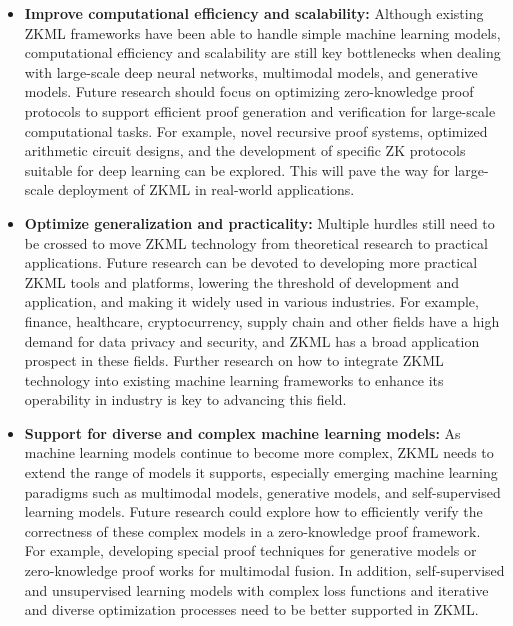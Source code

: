 \documentclass[journal]{IEEEtran}
\begin{document}
\begin{itemize}
    \item \textbf{Improve computational efficiency and scalability:} Although existing ZKML frameworks have been able to handle simple machine learning models, computational efficiency and scalability are still key bottlenecks when dealing with large-scale deep neural networks, multimodal models, and generative models. Future research should focus on optimizing zero-knowledge proof protocols to support efficient proof generation and verification for large-scale computational tasks. For example, novel recursive proof systems, optimized arithmetic circuit designs, and the development of specific ZK protocols suitable for deep learning can be explored. This will pave the way for large-scale deployment of ZKML in real-world applications.
    
    \item \textbf{Optimize generalization and practicality:} Multiple hurdles still need to be crossed to move ZKML technology from theoretical research to practical applications. Future research can be devoted to developing more practical ZKML tools and platforms, lowering the threshold of development and application, and making it widely used in various industries. For example, finance, healthcare, cryptocurrency, supply chain and other fields have a high demand for data privacy and security, and ZKML has a broad application prospect in these fields. Further research on how to integrate ZKML technology into existing machine learning frameworks to enhance its operability in industry is key to advancing this field.
    
    \item \textbf{Support for diverse and complex machine learning models:} As machine learning models continue to become more complex, ZKML needs to extend the range of models it supports, especially emerging machine learning paradigms such as multimodal models, generative models, and self-supervised learning models. Future research could explore how to efficiently verify the correctness of these complex models in a zero-knowledge proof framework. For example, developing special proof techniques for generative models or zero-knowledge proof works for multimodal fusion. In addition, self-supervised and unsupervised learning models with complex loss functions and iterative and diverse optimization processes need to be better supported in ZKML.
    

\end{itemize}
\end{document}
